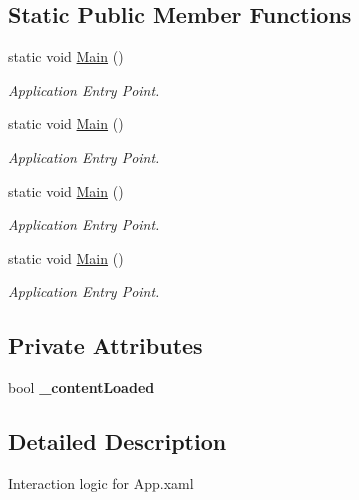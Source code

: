 \subsection*{Static Public Member Functions}
\begin{DoxyCompactItemize}
\item 
static void \mbox{\hyperlink{class_teacher_handbook_1_1_app_a023352bc757e3dc9fce26276dfdadd15}{Main}} ()
\begin{DoxyCompactList}\small\item\em Application Entry Point. \end{DoxyCompactList}\item 
static void \mbox{\hyperlink{class_teacher_handbook_1_1_app_a023352bc757e3dc9fce26276dfdadd15}{Main}} ()
\begin{DoxyCompactList}\small\item\em Application Entry Point. \end{DoxyCompactList}\item 
static void \mbox{\hyperlink{class_teacher_handbook_1_1_app_a023352bc757e3dc9fce26276dfdadd15}{Main}} ()
\begin{DoxyCompactList}\small\item\em Application Entry Point. \end{DoxyCompactList}\item 
static void \mbox{\hyperlink{class_teacher_handbook_1_1_app_a023352bc757e3dc9fce26276dfdadd15}{Main}} ()
\begin{DoxyCompactList}\small\item\em Application Entry Point. \end{DoxyCompactList}\end{DoxyCompactItemize}
\subsection*{Private Attributes}
\begin{DoxyCompactItemize}
\item 
\mbox{\label{class_teacher_handbook_1_1_app_af85a80dcd07d73660fe52c78248265eb}} 
bool {\bfseries \+\_\+content\+Loaded}
\end{DoxyCompactItemize}


\subsection{Detailed Description}
Interaction logic for App.\+xaml 

